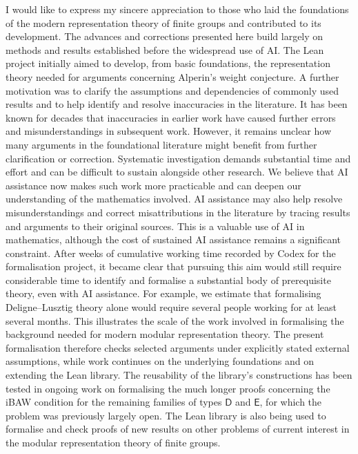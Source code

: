 \documentclass[10pt]{amsart}
\theoremstyle{definition}
\numberwithin{equation}{section}
\numberwithin{table}{section}
\begin{document}
I would like to express my sincere appreciation to those who laid the
foundations of the modern representation theory of finite groups and
contributed to its development. The advances and corrections presented here
build largely on methods and results established before the widespread use
of AI. The Lean project initially aimed to develop, from basic foundations, the
representation theory needed for arguments concerning Alperin's weight
conjecture. A further motivation was to clarify the assumptions and
dependencies of commonly used results and to help identify and resolve
inaccuracies in the literature. It has been known for decades that inaccuracies in earlier work have
caused further errors and misunderstandings in subsequent work. However,
it remains unclear how many arguments in the foundational literature
might benefit from further clarification or correction. Systematic investigation demands
substantial time and effort and can be difficult to sustain alongside
other research. We believe that AI assistance now makes such work more
practicable and can deepen our understanding of the mathematics involved.
AI assistance may also help resolve misunderstandings and correct
misattributions in the literature by tracing results and arguments to
their original sources.
This is a valuable use of AI in mathematics, although the cost of sustained
AI assistance remains a significant constraint.
After weeks of cumulative working time recorded by Codex for the
formalisation project, it became clear that pursuing this aim would still
require considerable time to identify and formalise a substantial body of
prerequisite theory, even with AI assistance. For example, we estimate that
formalising Deligne--Lusztig theory alone would require several people
working for at least several months. This illustrates the scale of the work involved in
formalising the background needed for modern modular representation theory.
The present formalisation therefore checks selected arguments under
explicitly stated external assumptions, while work continues on the
underlying foundations and on extending the Lean library. The reusability of the library's constructions has been tested in ongoing work
on formalising
the much longer proofs concerning the iBAW condition for the remaining families of
types $\mathsf D$ and $\mathsf E$, for which the problem was previously
largely open. The Lean library is also being used to formalise and check
proofs of new results on other problems of current interest in the
modular representation theory of finite groups.
\end{document}
